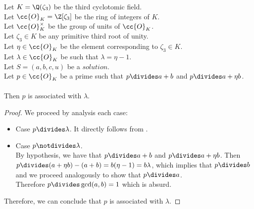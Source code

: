 \begin{lemma}
  \label{lmm:associated_of_dvd_a_add_b_of_dvd_a_add_eta_mul_b}
  \leanok
  Let $K = \Q(\zeta_3)$ be the third cyclotomic field. \\
  Let $\cc{O}_K = \Z[\zeta_3]$ be the ring of integers of $K$. \\
  Let $\cc{O}^\times_K$ be the group of units of $\cc{O}_K$. \\
  Let $\zeta_3 \in K$ be any primitive third root of unity. \\
  Let $\eta \in \cc{O}_K$ be the element corresponding to $\zeta_3 \in K$. \\
  Let $\lambda \in \cc{O}_K$ be such that $\lambda = \eta -1$. \\
  Let $S=(a, b, c, u)$ be a $solution$.\\
  Let $p \in \cc{O}_K$ be a prime such that $p \divides a+b$
  and $p \divides a+\eta  b$.\\\\
  Then $p$ is associated with $\lambda$.
\end{lemma}
\begin{proof}
  \leanok
  We proceed by analysis each case:
  \begin{itemize}
      \item Case $p \divides \lambda$. It directly follows from .
      \item Case $p \notdivides \lambda$. \\
            By hypothesis, we have that $p \divides a+b$ and $p \divides a+\eta b$.
            Then $p \divides (a+\eta b) - (a+b) = b (\eta-1) = b \lambda$, which implies that
            $p \divides b$ and we proceed analogously to show that $p \divides a$.\\
            Therefore $p \divides \gcd(a,b)=1$ which is absurd.
  \end{itemize}
  Therefore, we can conclude that $p$ is associated with $\lambda$.
\end{proof}

